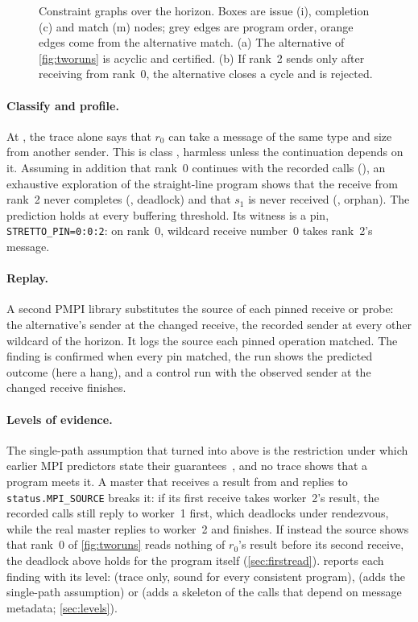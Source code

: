 \begin{figure}[t]

\caption{Constraint graphs over the horizon. Boxes are issue (\textsf{i}), completion
(\textsf{c}) and match (\textsf{m}) nodes; grey edges are program order, orange edges
come from the alternative match. (a) The alternative of \cref{fig:tworuns} is acyclic
and certified. (b) If rank~2 sends only after receiving from rank~0, the alternative
closes a cycle and is rejected.}
\label{fig:graph}
\end{figure}

\paragraph{Classify and profile.} At \Lone, the trace alone says that $r_0$ can take a
message of the same type and size from another sender. This is class , harmless
unless the continuation depends on it. Assuming in addition that rank~0 continues with the
recorded calls (\LoneSP), an exhaustive exploration of the straight-line program shows
that the receive from rank~2 never completes (, deadlock) and that $s_1$ is never
received (, orphan). The prediction holds at every buffering threshold. Its
witness is a pin, \texttt{STRETTO\_PIN=0:0:2}: on rank~0, wildcard receive number~0
takes rank~2's message.

\paragraph{Replay.} A second PMPI library substitutes the source of each pinned receive or
probe: the alternative's sender at the changed receive, the recorded sender at every other
wildcard of the horizon. It logs the source each pinned operation matched. The finding is
confirmed when every pin matched, the run shows the predicted outcome (here a hang), and a
control run with the observed sender at the changed receive finishes.

\paragraph{Levels of evidence.} The single-path assumption that turned  into
 above is the restriction under which earlier MPI predictors state their
guarantees~\citep{forejt17mopper}, and no trace shows that a program meets it. A master that
receives a result from \anysrc and replies to \texttt{status.MPI\_SOURCE} breaks it: if its
first receive takes worker~2's result, the recorded calls still reply to worker~1 first, which
deadlocks under rendezvous, while the real master replies to worker~2 and finishes. If instead
the source shows that rank~0 of \cref{fig:tworuns} reads nothing of $r_0$'s result before its
second receive, the deadlock above holds for the program itself (\cref{sec:firstread}). \tool reports each
finding with its level: \Lone (trace only, sound for every consistent program), \LoneSP (adds
the single-path assumption) or \Ltwo (adds a skeleton of the calls that depend on message
metadata; \cref{sec:levels}).


